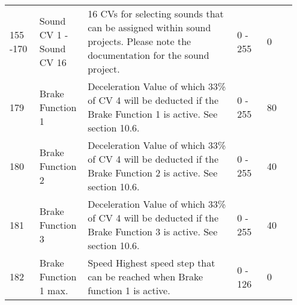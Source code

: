 \begin{tabular}{p{0.1\linewidth} p{0.15\linewidth} p{0.5\linewidth} p{0.1\linewidth} p{0.1\linewidth}}
155 -170 & Sound CV 1 - Sound CV 16 & 16 CVs for selecting sounds that can be assigned within sound projects. Please note the documentation for the sound project. & 0 - 255 & 0\\
179 & Brake Function 1 & Deceleration Value of which 33\% of CV 4 will be deducted if the Brake Function 1 is active. See section 10.6. & 0 - 255 & 80\\
180 & Brake Function 2 & Deceleration Value of which 33\% of CV 4 will be deducted if the Brake Function 2 is active. See section 10.6. & 0 - 255 & 40\\
181 & Brake Function 3 & Deceleration Value of which 33\% of CV 4 will be deducted if the Brake Function 3 is active. See section 10.6. & 0 - 255 & 40\\
182 & Brake Function 1 max. & Speed Highest speed step that can be reached when Brake function 1 is active. & 0 - 126 & 0\\
\end{tabular}
